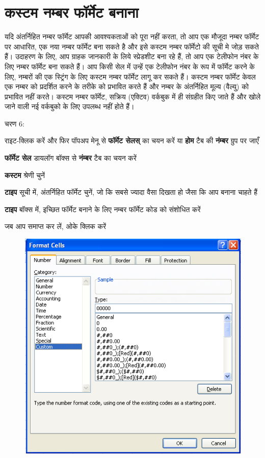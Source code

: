 \section{कस्टम नम्बर फॉर्मेट बनाना}\label{id-2.8}

यदि अंतर्निहित नम्बर फॉर्मेट आपकी आवश्यकताओं को पूरा नहीं करता, तो आप एक मौजूदा नम्बर फॉर्मेट पर आधारित, एक नया नम्बर फॉर्मेट बना सकते है और इसे कस्टम नम्बर फॉर्मेटो की सूची मे जोड़ सकते हैं। उदाहरण के लिए, आप ग्राहक जानकारी के लिये स्प्रेडशीट बना रहे हैं, तो आप एक टेलीफोन नंबर के लिए नम्बर फॉर्मेट बना सकते हैं। आप किसी सेल में उन्हें एक टेलीफोन नंबर के रूप में फॉर्मेट करने के लिए, नम्बरों की एक स्ट्रिंग के लिए कस्टम नम्बर फॉर्मेट लागू कर सकते हैं। कस्टम नम्बर फॉर्मेट केवल एक नम्बर को प्रदर्शित करने के तरीके को प्रभावित करते हैं और नम्बर के अंतर्निहित मूल्य (वैल्यु) को प्रभावित नहीं करते। कस्टम नम्बर फॉर्मेट, सक्रिय (एक्टिव) वर्कबुक में ही संग्रहीत किए जाते हैं और खोले जाने वाली नई वर्कबुको के लिए उपलब्ध नहीं होते हैं।
\begin{descriptionSimple}{चरण 6:}
\item[चरण 1] राइट-क्लिक करें और फिर पॉपअप मेनू से \textbf{फॉर्मेट सेलस्} का चयन करें या \textbf{होम} टैब की \textbf{नंम्बर} ग्रुप पर जाएँ
\item[चरण 2] \textbf{फॉर्मेट सेल} डायलॉग बॉक्स से \textbf{नंम्बर} टैब का चयन करें
\item[चरण 3] \textbf{कस्टम} श्रेणी चुनें
\item[चरण 4] \textbf{टाइप} सूची में, अंतर्निहित फॉर्मेट चुनें, जो कि सबसे ज्यादा वैसा दिखता हो जैसा कि आप बनाना चाहते हैं
\item[चरण 5] \textbf{टाइप} बॉक्स में, इच्छित फॉर्मेट बनाने के लिए नम्बर फॉर्मेट कोड को संशोधित करें
\item[चरण 6] जब आप समाप्त कर लें, ओके क्लिक करें
\end{descriptionSimple}
\begin{figure}[H]
\centering
\includegraphics[scale=.58]{src/images/chapter2/chapter2_fig16.png}
\end{figure}

